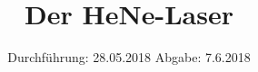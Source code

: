 

\subject{V61}
\title{\texorpdfstring{Der HeNe-Laser}{}}
\date{
	Durchführung: 28.05.2018
	\hspace{4em}
	Abgabe: 7.6.2018
}


	\maketitle
	\newpage
	\tableofcontents
	\newpage
	
	
	
	
	
	
	\newpage

	\printbibliography


